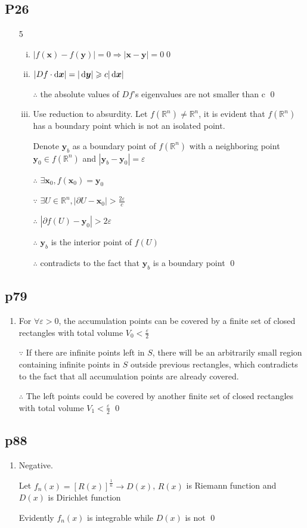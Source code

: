 

\subsection{P26}
\begin{enumerate}[1]
\item[5]
    \begin{enumerate}[(i)]
    \item
    $|f(\bm{x})-f(\bm{y})|=0 \Rightarrow |\bm{x}-\bm{y}|=0 $\qed

    \item
    $|Df \cdot \dif \bm{x}|=|\dif \bm{y}| \geqslant c|\dif\bm{x}|$
    \par $\therefore$ the absolute values of $Df$'s eigenvalues are not smaller than c \qed

    \item
    Use reduction to absurdity. Let $f(\mathbb{R}^n)\neq \mathbb{R}^n$, it is evident that $f(\mathbb{R}^n)$ has a boundary point which is not an isolated point.
    \par Denote $\bm{y}_b$ as a boundary point of $f(\mathbb{R}^n)$ with a neighboring point $\bm{y}_0\in f(\mathbb{R}^n)$ and $|\bm{y}_b - \bm{y}_0|=\varepsilon$
    \par $\therefore$ $\exists \bm{x}_0, f(\bm{x}_0)=\bm{y}_0$
    \par $\because$ $\exists U\in \mathbb{R}^n, |\partial U-\bm{x}_0|>\frac{2\varepsilon}{c}$
    \par $\therefore$ $|\partial f(U)-\bm{y}_0|>2\varepsilon$
    \par $\therefore$ $\bm{y}_b$ is the interior point of $f(U)$
    \par $\therefore$ contradicts to the fact that $\bm{y}_b$ is a boundary point \qed
    \end{enumerate}
\end{enumerate}

\subsection{p79}
\begin{enumerate}[3]
    \item
    For $\forall \varepsilon >0 $, the accumulation points can be covered by a finite set of closed rectangles with total volume $V_0 <\frac{\varepsilon}{2}$
    \par $\because$ If there are infinite points left in $S$, there will be an arbitrarily small region containing infinite points in $S$ outside previous rectangles, which contradicts to the fact that all accumulation points are already covered.
    \par $\therefore$ The left points could be covered by another finite set of closed rectangles with total volume $V_1 <\frac{\varepsilon}{2}$ \qed
\end{enumerate}

\subsection{p88}
\begin{enumerate}[4]
    \item
    Negative.
    \par Let $f_n(x)=[R(x)]^{\frac{1}{n}}\rightarrow D(x)$, $R(x)$ is Riemann function and $D(x)$ is Dirichlet function
    \par Evidently $f_n(x)$ is integrable while $D(x)$ is not \qed
\end{enumerate}